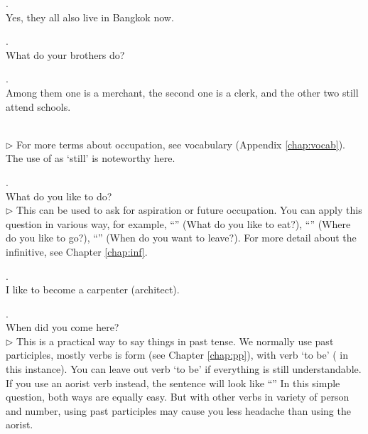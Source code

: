 \medskip
{}. \\
\hspace*{12mm}Yes, they all also live in Bangkok now.

\medskip
{}. \\
\hspace*{12mm}What do your brothers do?

\medskip
\parbox[lt]{0.93\linewidth}{\raggedright{}. \\
\hspace*{6mm}Among them one is a merchant, the second one is a clerk, and the other two still attend schools.}\\[1mm]
{\small $\triangleright$ For more terms about occupation, see vocabulary (Appendix \ref{chap:vocab}). The use of  as `still' is noteworthy here.}

\medskip
{}. \\
\hspace*{12mm}What do you like to do?\\
{\small $\triangleright$ This can be used to ask for aspiration or future occupation. You can apply this question in various way, for example, ``'' (What do you like to eat?), ``'' (Where do you like to go?), ``'' (When do you want to leave?). For more detail about the infinitive, see Chapter \ref{chap:inf}.}

\medskip
{}. \\
\hspace*{12mm}I like to become a carpenter (architect).

\medskip
{}. \\
\hspace*{12mm}When did you come here?\\
{\small $\triangleright$ This is a practical way to say things in past tense. We normally use past participles, mostly verbs is  form (see Chapter \ref{chap:pp}), with verb `to be' ( in this instance). You can leave out verb `to be' if everything is still understandable. If you use an aorist verb instead, the sentence will look like ``'' In this simple question, both ways are equally easy. But with other verbs in variety of person and number, using past participles may cause you less headache than using the aorist.}

